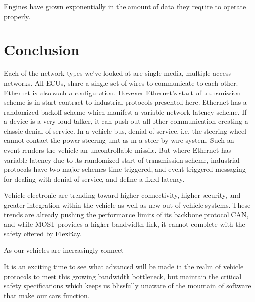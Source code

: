 \documentclass[conference,12pt]{IEEEtran}
\begin{document}
Engines have grown exponentially in the amount of data they require to operate
properly. 
\section{Conclusion}
Each of the network types we've looked at are single media, multiple access
networks.  All ECUs, share a single set of wires to communicate to each other.
Ethernet is also such a configuration. However Ethernet's start of transmission
scheme is in start contract to industrial protocols presented here. Ethernet has
a randomized backoff scheme which manifest a variable network latency scheme.
If a device is a very loud talker, it can push out all other communication
creating a classic denial of service. In a vehicle bus, denial of service, i.e.
the steering wheel cannot contact the power steering unit as in a steer-by-wire
system. Such an event renders the vehicle an uncontrollable missile. But where Ethernet has variable latency
due to its randomized start of transmission scheme, industrial protocols have
two major schemes time triggered, and event triggered messaging for dealing with denial of service, and define a fixed
latency. 

Vehicle electronic are trending toward higher connectivity, higher security, and
greater integration within the vehicle as well as new out of vehicle systems.
These trends are already pushing the performance limits of its backbone protocol
CAN, and while MOST provides a higher bandwidth link, it cannot complete with
the safety offered by FlexRay.

As our vehicles are increasingly connect

It is an exciting time to see what advanced will be
made in the realm of vehicle protocols to meet this growing bandwidth bottleneck,
but maintain the critical safety specifications which keeps us blissfully unaware
of the mountain of software that make our cars function. 

\printbibliography
\end{document}
